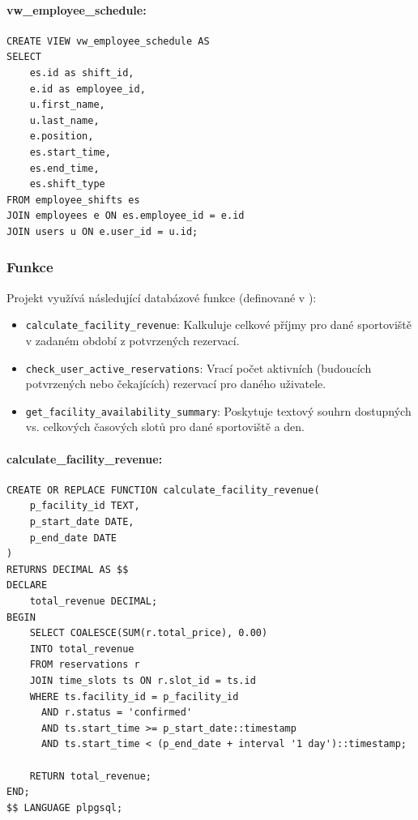 \documentclass[12pt, a4paper]{article}
\begin{document}
\paragraph{vw\_employee\_schedule:}
\begin{lstlisting}
CREATE VIEW vw_employee_schedule AS
SELECT
    es.id as shift_id,
    e.id as employee_id,
    u.first_name,
    u.last_name,
    e.position,
    es.start_time,
    es.end_time,
    es.shift_type
FROM employee_shifts es
JOIN employees e ON es.employee_id = e.id
JOIN users u ON e.user_id = u.id;
\end{lstlisting}

\subsubsection{Funkce}
\label{subsubsec:funkce}

Projekt využívá následující databázové funkce (definované v ):

\begin{itemize}
    \item \texttt{calculate\_facility\_revenue}: Kalkuluje celkové příjmy pro dané sportoviště v zadaném období z potvrzených rezervací.
    \item \texttt{check\_user\_active\_reservations}: Vrací počet aktivních (budoucích potvrzených nebo čekajících) rezervací pro daného uživatele.
    \item \texttt{get\_facility\_availability\_summary}: Poskytuje textový souhrn dostupných vs. celkových časových slotů pro dané sportoviště a den.
\end{itemize}

\paragraph{calculate\_facility\_revenue:}
\begin{lstlisting}
CREATE OR REPLACE FUNCTION calculate_facility_revenue(
    p_facility_id TEXT,
    p_start_date DATE,
    p_end_date DATE
)
RETURNS DECIMAL AS $$
DECLARE
    total_revenue DECIMAL;
BEGIN
    SELECT COALESCE(SUM(r.total_price), 0.00)
    INTO total_revenue
    FROM reservations r
    JOIN time_slots ts ON r.slot_id = ts.id
    WHERE ts.facility_id = p_facility_id
      AND r.status = 'confirmed'
      AND ts.start_time >= p_start_date::timestamp
      AND ts.start_time < (p_end_date + interval '1 day')::timestamp;

    RETURN total_revenue;
END;
$$ LANGUAGE plpgsql;
\end{lstlisting}
\end{document}

